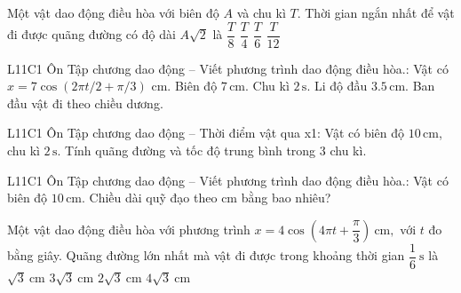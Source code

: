 \begin{ex}
Một vật dao động điều hòa với biên độ $A$ và chu kì $T$. Thời gian ngắn nhất để vật đi được quãng đường có độ dài $A\sqrt{2}$ là
\choice
{$\dfrac{T}{8}$}
{\True $\dfrac{T}{4}$}
{$\dfrac{T}{6}$}
{$\dfrac{T}{12}$}
\end{ex}

\begin{ex}
L11C1 Ôn Tập chương dao động – Viết phương trình dao động điều hòa.: Vật có $x=7\cos(2\pi t/2+\pi/3)$ cm.
\choiceTF
{\True Biên độ $7\,\text{cm}$.}
{\True Chu kì $2\,\text{s}$.}
{\True Li độ đầu $3.5\,\text{cm}$.}
{Ban đầu vật đi theo chiều dương.}
\end{ex}

\begin{ex}
L11C1 Ôn Tập chương dao động – Thời điểm vật qua x1: Vật có biên độ $10\,\text{cm}$, chu kì $2\,\text{s}$. Tính quãng đường và tốc độ trung bình trong 3 chu kì.
\choiceTF

\end{ex}

\begin{ex}
L11C1 Ôn Tập chương dao động – Viết phương trình dao động điều hòa.: Vật có biên độ $10\,\text{cm}$. Chiều dài quỹ đạo theo cm bằng bao nhiêu?
\end{ex}

\begin{ex}
Một vật dao động điều hòa với phương trình
$x=4\cos\left(4\pi t+\dfrac{\pi}{3}\right)\ \text{cm},$
với $t$ đo bằng giây. Quãng đường lớn nhất mà vật đi được trong khoảng thời gian $\dfrac{1}{6}\ \text{s}$ là
\choice
{$\sqrt{3}\ \text{cm}$}
{$3\sqrt{3}\ \text{cm}$}
{$2\sqrt{3}\ \text{cm}$}
{\True $4\sqrt{3}\ \text{cm}$}
\end{ex}

